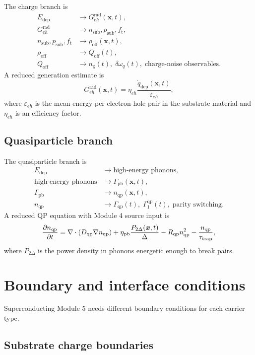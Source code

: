 \documentclass[11pt]{article}
\newcommand{\x}{\bm{x}}
\newcommand{\DeltaSC}{\Delta}
\newcommand{\nqp}{n_{\mathrm{qp}}}
\newcommand{\Dqp}{D_{\mathrm{qp}}}
\newcommand{\Rqp}{R_{\mathrm{qp}}}
\newcommand{\tautrap}{\tau_{\mathrm{trap}}}
\newcommand{\GammaQP}{\Gamma_{\mathrm{qp}}}
\newcommand{\GammaPB}{\Gamma_{\mathrm{pb}}}
\newcommand{\ngate}{n_{\mathrm{g}}}
\newcommand{\Qoff}{Q_{\mathrm{off}}}
\newcommand{\ft}{f_{\mathrm{t}}}
\newcommand{\rhooff}{\rho_{\mathrm{off}}}
\begin{document}
The charge branch is
\begin{align}
E_{\mathrm{dep}} &\longrightarrow G_{eh}^{\mathrm{rad}}(\x,t),\\
G_{eh}^{\mathrm{rad}} &\longrightarrow n_{\mathrm{sub}},p_{\mathrm{sub}},\ft,\\
n_{\mathrm{sub}},p_{\mathrm{sub}},\ft &\longrightarrow \rhooff(\x,t),\\
\rhooff &\longrightarrow \Qoff(t),\\
\Qoff &\longrightarrow \ngate(t),\;\delta\omega_q(t),\;\text{charge-noise observables}.
\end{align}
A reduced generation estimate is
\begin{equation}
G_{eh}^{\mathrm{rad}}(\x,t)=\eta_{eh}\frac{\dot q_{\mathrm{dep}}(\x,t)}{\varepsilon_{eh}},
\end{equation}
where \(\varepsilon_{eh}\) is the mean energy per electron-hole pair in the substrate material and \(\eta_{eh}\) is an efficiency factor.

\subsection{Quasiparticle branch}

The quasiparticle branch is
\begin{align}
E_{\mathrm{dep}} &\longrightarrow \text{high-energy phonons},\\
\text{high-energy phonons} &\longrightarrow \GammaPB(\x,t),\\
\GammaPB &\longrightarrow \nqp(\x,t),\\
\nqp &\longrightarrow \GammaQP(t),\;\Gamma_1^{\mathrm{qp}}(t),\;\text{parity switching}.
\end{align}
A reduced QP equation with Module 4 source input is
\begin{equation}
\pdv{\nqp}{t}=\nabla\cdot(\Dqp\nabla\nqp)+\eta_{\mathrm{pb}}\frac{P_{2\Delta}(\x,t)}{\DeltaSC}-\Rqp\nqp^2-\frac{\nqp}{\tautrap},
\end{equation}
where \(P_{2\Delta}\) is the power density in phonons energetic enough to break pairs.

\section{Boundary and interface conditions}

Superconducting Module 5 needs different boundary conditions for each carrier type.

\subsection{Substrate charge boundaries}
\end{document}

